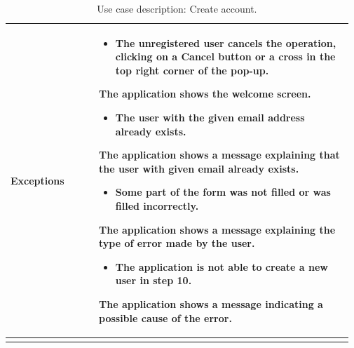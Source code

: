 \begin{longtable}{@{}p{0.25\linewidth} p{0.72\linewidth}@{}}
	\textbf{Exceptions}         & \begin{itemize}[leftmargin=.4cm,noitemsep,topsep=0pt,before=\vspace{-3mm}]
	   \item The unregistered user cancels the operation, clicking on a Cancel button or a cross in the top right corner of the pop-up.
	\end{itemize}
	The application shows the welcome screen.
	\begin{itemize}[leftmargin=.4cm,noitemsep,topsep=0pt]
	   \item The user with the given email address already exists. 
	\end{itemize}
	The application shows a message explaining that the user with given email already exists.
	\begin{itemize}[leftmargin=.4cm,noitemsep,topsep=0pt]
	   \item Some part of the form was not filled or was filled incorrectly.
	\end{itemize}
	The application shows a message explaining the type of error made by the user.
    \begin{itemize}[leftmargin=.4cm,noitemsep,topsep=0pt]
	   \item The application is not able to create a new user in step 10.
	\end{itemize}
	The application shows a message indicating a possible cause of the error.
    \\\bottomrule
	\caption{Use case description: Create account.}
\end{longtable}

